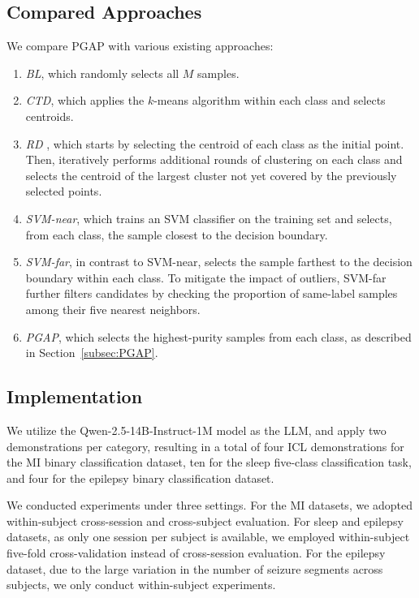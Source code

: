 \documentclass[journal,twocolumn]{IEEEtran}
\begin{document}
\subsection{Compared Approaches}
We compare PGAP with various existing approaches:
\begin{enumerate}
\item \emph{BL}, which randomly selects all $M$ samples.
\item \emph{CTD}, which applies the $k$-means algorithm within each class and selects centroids.
\item \emph{RD} \cite{wu2018pool}, which starts by selecting the centroid of each class as the initial point. Then, iteratively performs additional rounds of clustering on each class and selects the centroid of the largest cluster not yet covered by the previously selected points.
\item \emph{SVM-near}, which trains an SVM classifier on the training set and selects, from each class, the sample closest to the decision boundary.
\item \emph{SVM-far}, in contrast to SVM-near, selects the sample farthest to the decision boundary within each class. To mitigate the impact of outliers, SVM-far further filters candidates by checking the proportion of same-label samples among their five nearest neighbors.
\item \emph{PGAP}, which selects the highest-purity samples from each class, as described in Section~\ref{subsec:PGAP}.
\end{enumerate}

\subsection{Implementation}
We utilize the Qwen-2.5-14B-Instruct-1M model as the LLM, and apply two demonstrations per category, resulting in a total of four ICL demonstrations for the MI binary classification dataset, ten for the sleep five-class classification task, and four for the epilepsy binary classification dataset.

We conducted experiments under three settings. For the MI datasets, we adopted within-subject cross-session and cross-subject evaluation. For sleep and epilepsy datasets, as only one session per subject is available, we employed within-subject five-fold cross-validation instead of cross-session evaluation. For the epilepsy dataset, due to the large variation in the number of seizure segments across subjects, we only conduct within-subject experiments.
\end{document}
